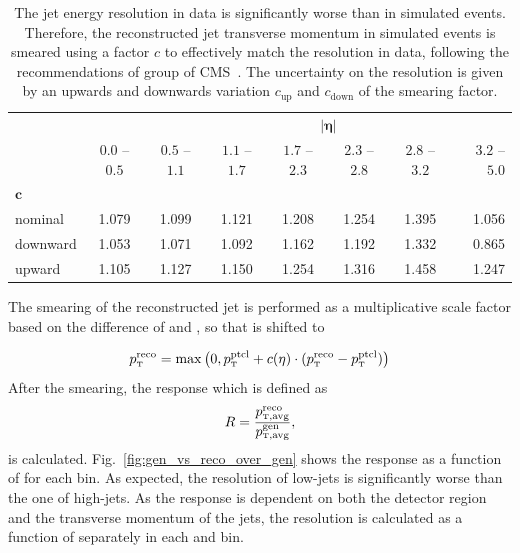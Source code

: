 \begin{table}[htbp]
\setlength\tabcolsep{4.5pt} 
    \centering
    \caption[Jet energy resolution scale factors]{
             The jet energy resolution in data is significantly worse than in
             simulated events. Therefore, the reconstructed jet transverse
             momentum in simulated events is smeared using a factor $c$ to
             effectively match the resolution in data, following the
             recommendations of \JetMET group of CMS~\cite{jetmet:resolution}.
             The uncertainty on the resolution is given by an upwards and
             downwards variation $c_\mathrm{up}$ and
             $c_\mathrm{down}$ of the smearing factor.}
    \label{tab:res_smearing}

    \begin{tabular}{lccccccr}
    \toprule
                        &                & \multicolumn{6}{c}{$\bm{|\eta|}$}\\\cmidrule{2-8}
                        & $0.0$ -- $0.5$ & $0.5$ -- $1.1$                                    & $1.1$ -- $1.7$   & $1.7$ --
               $2.3$    & $2.3$ -- $2.8$ & $2.8$ -- $3.2$                                    & $3.2$ -- $5.0$\\
               $\bm{c}$ &                &                                                   &                  &          &       &       & \\\cmidrule{1-1}
    nominal             & 1.079          & 1.099                                             & 1.121            & 1.208    & 1.254 & 1.395 & 1.056\\
    downward            & 1.053          & 1.071                                             & 1.092            & 1.162    & 1.192 & 1.332 & 0.865\\
    upward              & 1.105          & 1.127                                             & 1.150            & 1.254    & 1.316 & 1.458 & 1.247\\
    \bottomrule
    \end{tabular}
\end{table}

The smearing of the reconstructed jet \pt is performed as a multiplicative scale
factor based on the difference of \ptreco and \ptgen, so that \ptreco is shifted
to

\begin{equation}
\ptreco = \max \left( 0, \ptgen + c(\eta) \cdot (\ptreco - \ptgen) \right)
\end{equation}
%
After the smearing, the response which is defined as
%
\begin{equation}
    R = \frac{\ptavg^{\text{reco}}}{\ptavg^{\text{gen}}},
\end{equation}
%
is calculated. Fig.~\ref{fig:gen_vs_reco_over_gen} shows the response as a
function of \ptgen for each bin. As expected, the resolution of low-\pt jets is
significantly worse than the one of high-\pt jets. As the response is dependent
on both the detector region and the transverse momentum of the jets, the resolution
is calculated as a function of \ptavggen separately in each \ystar and \yboost
bin. 

